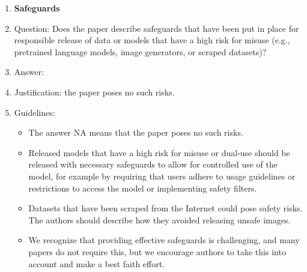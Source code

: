 \documentclass{article}
\begin{document}
\begin{enumerate}
\item {\bf Safeguards}
    \item[] Question: Does the paper describe safeguards that have been put in place for responsible release of data or models that have a high risk for misuse (e.g., pretrained language models, image generators, or scraped datasets)?
    \item[] Answer: \answerNA{} %
    \item[] Justification: the paper poses no such risks.
    \item[] Guidelines:
    \begin{itemize}
        \item The answer NA means that the paper poses no such risks.
        \item Released models that have a high risk for misuse or dual-use should be released with necessary safeguards to allow for controlled use of the model, for example by requiring that users adhere to usage guidelines or restrictions to access the model or implementing safety filters. 
        \item Datasets that have been scraped from the Internet could pose safety risks. The authors should describe how they avoided releasing unsafe images.
        \item We recognize that providing effective safeguards is challenging, and many papers do not require this, but we encourage authors to take this into account and make a best faith effort.
    \end{itemize}


\end{enumerate}
\end{document}
